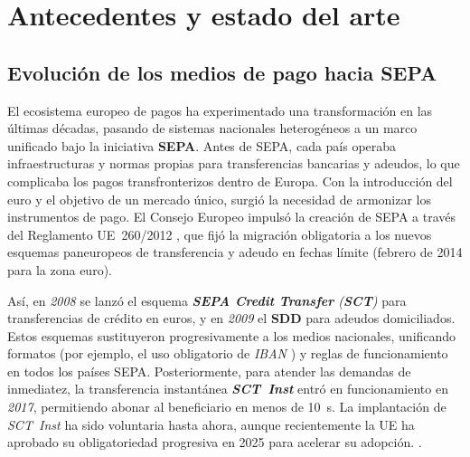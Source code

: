 
\section{Antecedentes y estado del arte}
\label{sec:estado-arte}

\subsection{Evolución de los medios de pago hacia SEPA}
\label{subsec:evolucion-sepa}


El ecosistema europeo de pagos ha experimentado una transformación en las últimas décadas, pasando de sistemas nacionales heterogéneos a un marco unificado bajo la iniciativa \textbf{SEPA}. Antes de SEPA, cada país operaba infraestructuras y normas propias para transferencias bancarias y adeudos, lo que complicaba los pagos transfronterizos dentro de Europa.  
Con la introducción del euro y el objetivo de un mercado único, surgió la necesidad de armonizar los instrumentos de pago. El Consejo Europeo impulsó la creación de SEPA a través del Reglamento UE~\num{260}/\num{2012} \cite{eu_260_2012}, que fijó la migración obligatoria a los nuevos esquemas paneuropeos de transferencia y adeudo en fechas límite (febrero de 2014 para la zona euro).  
\vspace{0.5cm}

Así, en \textit{2008} se lanzó el esquema \textit{\textbf{SEPA Credit Transfer} (\textbf{SCT})} \cite{epc125_2023} para transferencias de crédito en euros, y en \textit{2009} el \textbf{SDD} para adeudos domiciliados. Estos esquemas sustituyeron progresivamente a los medios nacionales, unificando formatos (por ejemplo, el uso obligatorio de \emph{IBAN} \cite{EU_IBAN_2001}) y reglas de funcionamiento en todos los países SEPA. Posteriormente, para atender las demandas de inmediatez, la transferencia instantánea \textit{\textbf{SCT~Inst}} entró en funcionamiento en \textit{2017}, permitiendo abonar al beneficiario en menos de \SI{10}{\second}. La implantación de \textit{SCT~Inst} ha sido voluntaria hasta ahora, aunque recientemente la UE ha aprobado su obligatoriedad progresiva en 2025 para acelerar su adopción. \cite{EBA_RT1}.
\vspace{0.5cm}

